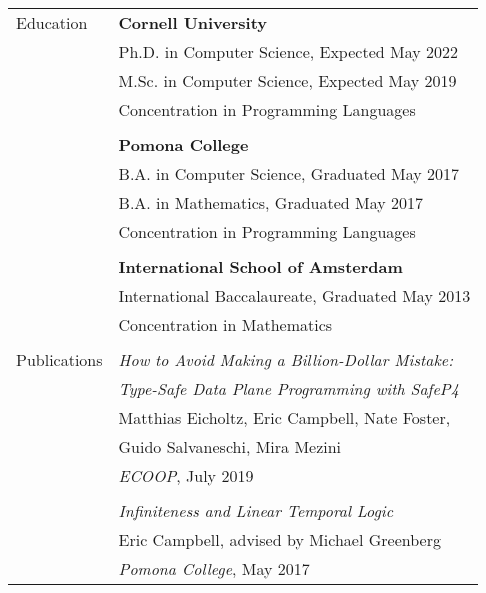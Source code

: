 \documentclass[letterpaper,11pt,oneside]{article}
\begin{document}
\noindent \begin{tabular}{@{} l l}
  \Large{Education} 
    & \textbf{Cornell University} \\
  
    & Ph.D. in Computer Science, Expected May 2022 \\

  
    & M.Sc. in Computer Science, Expected May 2019 \\
  

    & Concentration in Programming Languages \\
    & \\


    & \textbf{Pomona College} \\

    & B.A. in Computer Science, Graduated May 2017 \\

  
    & B.A. in Mathematics, Graduated May 2017 \\
  

    & Concentration in Programming Languages \\
    & \\


    & \textbf{International School of Amsterdam} \\

    & International Baccalaureate, Graduated May 2013 \\

    & Concentration in Mathematics \\
    & \\
  \Large{Publications}
    & \textit{How to Avoid Making a Billion-Dollar Mistake:}\\
     & \textit{Type-Safe Data Plane Programming with SafeP4} \\
    & Matthias Eicholtz, Eric Campbell, Nate Foster, \\ &Guido Salvaneschi, Mira Mezini \\
    & \textit{ECOOP}, July 2019 \\

 
    & \\

    & \textit{Infiniteness and Linear Temporal Logic} \\
    & Eric Campbell, advised by Michael Greenberg \\
    & \textit{Pomona College}, May 2017


\end{tabular}
\end{document}
